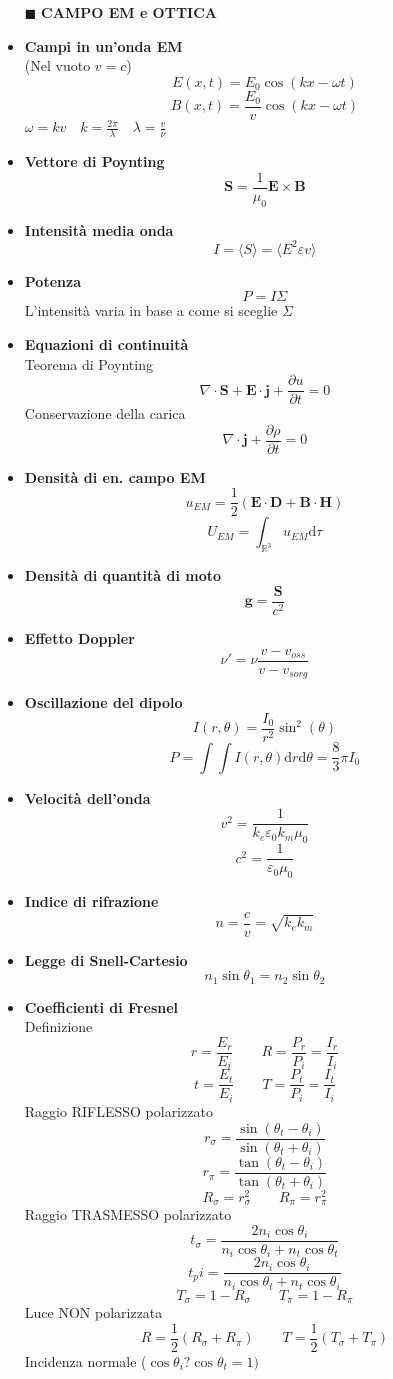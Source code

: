 \documentclass{book}
\newcommand{\g}{\textbf}
\newcommand{\h}{\mathbf}
\newcommand{\e}{\begin{equation}}
\newcommand{\ex}{\end{equation} }
\renewcommand{\it}{\item[$\cdot$]}
\begin{document}
\begin{multicols}{4}
\begin{itemize}
\item [$\blacksquare$] \g{CAMPO EM e OTTICA}
    \it \g{Campi in un'onda EM} \\
    (Nel vuoto $v=c$)
    \e{E(x,t)=E_0\cos(kx-\omega t)} \ex
    \e{B(x,t)=\frac{E_0}{v}\cos(kx-\omega t)} \ex
    $\omega=kv \quad k=\frac{2\pi}{\lambda} \quad \lambda=\frac{v}{\nu}$ \\
    \it \g{Vettore di Poynting}
    \e{\h{S}=\frac{1}{\mu_0}\h{E}\times\h{B}} \ex
    \it \g{Intensità media onda}
    \e{I=\langle S\rangle=\langle E^2\varepsilon v\rangle} \ex
    \it \g{Potenza}
    \e{P=I\Sigma} \ex
    L'intensità varia in base a come si sceglie $\Sigma$ \\
    \it \g{Equazioni di continuità} \\
    Teorema di Poynting
    \e{\nabla\cdot \h{S}+\h{E}\cdot\h{j}+\frac{\partial u}{\partial t}=0 } \ex
    Conservazione della carica
    \e{\nabla\cdot\h{j}+\frac{\partial \rho}{\partial t}=0} \ex
    \it \g{Densità di en. campo EM}
    \e{u_{EM}=\frac{1}{2}(\h{E}\cdot\h{D}+\h{B}\cdot\h{H})} \ex
    \e{U_{EM}=\int_{\mathbb{R}^3}u_{EM} \mathrm{d}\tau} \ex
    \it \g{Densità di quantità di moto}
    \e{\h{g}=\frac{\h{S}}{c^2}} \ex
    \it \g{Effetto Doppler}
    \e{\nu'=\nu\frac{v-v_{oss}}{v-v_{sorg}}} \ex
    \it \g{Oscillazione del dipolo}
    \e{I(r,\theta)=\frac{I_0}{r^2}\sin^2(\theta)} \ex
    \e{P=\int \int I(r,\theta) \mathrm{d}r \mathrm{d}\theta=\frac{8}{3}\pi I_0}\ex
    \it \g{Velocità dell'onda}
    \e{v^2=\frac{1}{k_e \varepsilon_0 k_m \mu_0}} \ex
    \e{c^2=\frac{1}{\varepsilon_0 \mu_0}} \ex
    \it \g{Indice di rifrazione}
    \e{n=\frac{c}{v}=\sqrt{k_ek_m}} \ex
    \it \g{Legge di Snell-Cartesio}
    \e{n_1 \sin\theta_1=n_2 \sin\theta_2} \ex
    \it \g{Coefficienti di Fresnel} \\
    Definizione
    \e{r=\frac{E_r}{E_i} \qquad R=\frac{P_r}{P_i}=\frac{I_r}{I_i}} \ex
    \e{t=\frac{E_t}{E_i} \qquad T=\frac{P_t}{P_i}=\frac{I_t}{I_i}} \ex
    Raggio RIFLESSO polarizzato
    \e{r_\sigma=\frac{\sin(\theta_t-\theta_i)}{\sin(\theta_t+\theta_i)}} \ex
    \e{r_\pi=\frac{\tan(\theta_t-\theta_i)}{\tan(\theta_t+\theta_i)}} \ex
    \e{R_\sigma=r_\sigma^2 \qquad R_\pi=r_\pi^2} \ex
    Raggio TRASMESSO polarizzato
    \e{t_\sigma=\frac{2n_i\cos\theta_i}{n_i\cos\theta_i+n_t\cos\theta_t}} \ex
    \e{t_pi=\frac{2n_i\cos\theta_i}{n_i\cos\theta_t+n_t\cos\theta_i}} \ex
    \e{T_\sigma=1-R_\sigma \qquad T_\pi=1-R_\pi} \ex
    Luce NON polarizzata
    \e{R=\frac{1}{2}(R_\sigma+R_\pi) \qquad T=\frac{1}{2}(T_\sigma+T_\pi)} \ex
    Incidenza normale ($\cos\theta_i?\cos\theta_t=1)$

\end{itemize}
\end{multicols}
\end{document}
